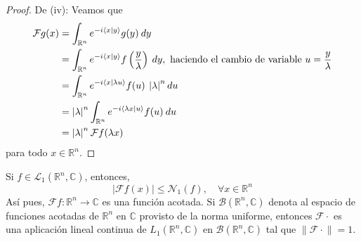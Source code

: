 \documentclass[12pt]{report}
\newcounter{it}
\theoremstyle{largebreak}
\renewcommand{\leq}{\ensuremath{\leqslant}}
\newcommand\abs[1]{\ensuremath{\left|#1\right|}}
\newcommand\cf[3]{\ensuremath{#1:#2\rightarrow#3}}
\newcommand\norm[1]{\ensuremath{\|#1\|}}
\newcommand\pint[2]{\ensuremath{\langle#1| #2\rangle}}
\newcommand{\N}[2]{\ensuremath{\mathcal{N}_{#1}\left(#2\right)}}
\newcommand{\fou}[1]{\ensuremath{\mathcal{F}#1}}
\begin{document}
\begin{proof}
        De (iv): Veamos que
        \begin{equation*}
            \begin{split}
                \fou{g}(x)&=\int_{\mathbb{R}^n}e^{-i\pint{x}{y}}g(y)\:dy\\
                &=\int_{\mathbb{R}^n}e^{-i\pint{x}{y}}f\left(\frac{y}{\lambda}\right) \:dy,\textup{ haciendo el cambio de variable }u=\frac{y}{\lambda} \\
                &=\int_{\mathbb{R}^n}e^{-i\pint{x}{\lambda u}}f(u) \:\abs{\lambda}^n du\\
                &=\abs{\lambda}^n\int_{\mathbb{R}^n}e^{-i\pint{\lambda x}{ u}}f(u) \:du\\
                &=\abs{\lambda}^n\fou{f}(\lambda x)\\
            \end{split}
        \end{equation*}
        para todo $x\in\mathbb{R}^n$.
    \end{proof}

    \begin{theor}
        Si $f\in\mathcal{L}_1(\mathbb{R}^n,\mathbb{C})$, entonces,
        \begin{equation*}
            \abs{\fou{f}(x)}\leq\N{1}{f},\quad\forall x\in\mathbb{R}^n
        \end{equation*}
        Así pues, $\cf{\fou{f}}{\mathbb{R}^n}{\mathbb{C}}$ es una función acotada. Si $\mathcal{B}(\mathbb{R}^n,\mathbb{C})$ denota al espacio de funciones acotadas de $\mathbb{R}^n$ en $\mathbb{C}$ provisto de la norma uniforme, entonces $\fou{\cdot}$ es una aplicación lineal continua de $L_1(\mathbb{R}^n,\mathbb{C})$ en $\mathcal{B}(\mathbb{R}^n,\mathbb{C})$ tal que $\norm{\fou{\cdot}}=1$.
    \end{theor}
\end{document}
